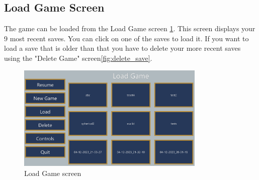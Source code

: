 \subsection{Load Game Screen}
The game can be loaded from the Load Game screen \ref{fig:load_game}.
This screen displays your 9 most recent saves.
You can click on one of the saves to load it.
If you want to load a save that is older than that you have to delete your more recent saves using the "Delete Game" screen\ref*{fig:delete_save}.

\begin{figure}[H]
    \centering
    \includegraphics[width=0.8\textwidth]{sections/user_manual/resources/load-game.png}
    \caption{Load Game screen}
    \label{fig:load_game}
\end{figure}